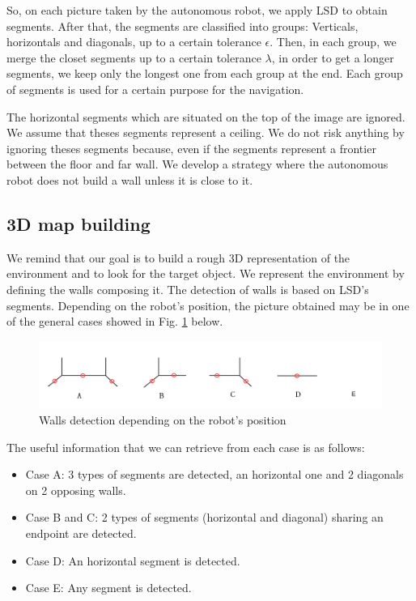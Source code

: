\documentclass[12pt]{report}
\begin{document}
  So, on each picture taken by the autonomous robot, we apply LSD to obtain segments. After that, the segments are 
classified into groups: Verticals, horizontals and diagonals, up to a certain tolerance $\epsilon$. Then, in each group, we merge the closet segments up to a certain tolerance $\lambda$, in order to 
get a longer segments, we keep only the longest one from each group at the end. Each group of segments is used for a 
certain purpose for the navigation.
  
The horizontal segments which are situated on the top of the image are ignored. We assume that theses segments represent 
a ceiling. We do not risk anything by ignoring theses segments because, even if the segments represent a frontier 
between the floor and far wall. We develop a strategy where the autonomous robot does not build a wall unless it is 
close to it.

    \subsection{3D map building}
    
   
    We remind that our goal is to build a rough 3D representation of the environment and to look for the target object. 
We represent the environment by defining the walls composing it. The detection of walls is based on LSD's segments. 
 Depending on the robot's position, the picture obtained may be in one of the general cases showed in Fig. 
\ref{fig:walls} below. 
    
    
    	\begin{figure}[H]
    	\begin{center}
    		\includegraphics[scale=0.65]{res/cases_seg.png}
    		\caption{Walls detection depending on the robot's position}
    		\label{fig:walls}
    	\end{center}
    \end{figure}
 
 \newpage
 The useful information that we can retrieve from each case is as follows:
 \begin{itemize}
 	\item Case A: 3 types of segments are detected, an horizontal one and 2 diagonals on 2 opposing walls.
 	\item Case B and C: 2 types of segments (horizontal and diagonal) sharing an endpoint are detected.
 	\item Case D: An horizontal segment is detected.
 	\item Case E: Any segment is detected.
 	
 \end{itemize}
 
\end{document}
